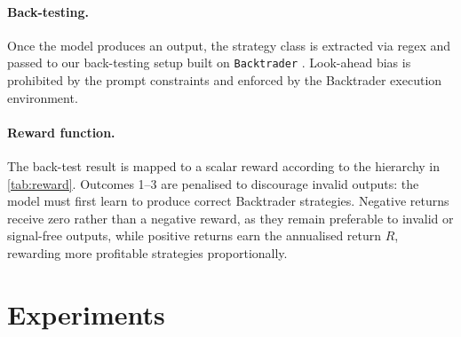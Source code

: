 \documentclass[conference,a4paper]{IEEEtran}
\begin{document}
\paragraph{Back-testing.}
Once the model produces an output, the strategy class is extracted via regex and passed
to our back-testing setup built on \texttt{Backtrader} \cite{backtrader2024}. Look-ahead
bias is prohibited by the prompt constraints and enforced by the Backtrader execution
environment.

\paragraph{Reward function.}
The back-test result is mapped to a scalar reward according to the hierarchy in
\cref{tab:reward}. Outcomes 1--3 are penalised to discourage invalid outputs: the model
must first learn to produce correct Backtrader strategies. Negative returns receive zero
rather than a negative reward, as they remain preferable to invalid or signal-free
outputs, while positive returns earn the annualised return $R$, rewarding more profitable
strategies proportionally.

\begin{table}[t]
  \centering
  \caption{Reward function: outcome categories ranked from worst to best.}
  \label{tab:reward}
\end{table}

\section{Experiments}
\label{ch:experiments}
\end{document}
